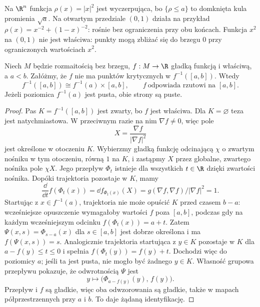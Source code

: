 \begin{przyklad}
Na $\R^n$ funkcja $\rho(x)=|x|^2$
jest wyczerpująca, bo
$\{\rho\leq a\}$ to domknięta
kula promienia $\sqrt a$.
Na otwartym przedziale $(0,1)$
działa na przykład
$\rho(x)=x^{-2}+(1-x)^{-2}$:
rośnie bez ograniczenia przy
obu końcach. Funkcja $x^2$
na $(0,1)$ nie jest właściwa:
punkty mogą zbliżać się do
brzegu $0$ przy ograniczonych
wartościach $x^2$.
\end{przyklad}

\begin{twierdzenie}
\label{thm:pas-bez-krytycznych-15}
Niech $M$ będzie rozmaitością bez brzegu,
$f:M\to\R$ gładką funkcją
i właściwą, a $a<b$. Załóżmy,
że $f$ nie ma punktów krytycznych
w $f^{-1}([a,b])$. Wtedy
\[
 f^{-1}([a,b])\cong f^{-1}(a)\times[a,b],
 \qquad f\ \text{odpowiada rzutowi na }[a,b].
\]
Jeżeli poziomica $f^{-1}(a)$ jest pusta,
obie strony są puste.
\end{twierdzenie}
\begin{proof}
Pas $K=f^{-1}([a,b])$ jest zwarty,
bo $f$ jest właściwa. Dla $K=\varnothing$ teza
jest natychmiastowa. W przeciwnym razie na nim
$\nabla f\ne0$, więc pole
\[
 X=\frac{\nabla f}{|\nabla f|^2}
\]
jest określone w otoczeniu $K$.
Wybierzmy gładką funkcję
odcinającą $\chi$ o zwartym
nośniku w tym otoczeniu,
równą $1$ na $K$, i zastąpmy
$X$ przez globalne, zwartego
nośnika pole $\chi X$.
Jego przepływ $\Phi_t$
istnieje dla wszystkich
$t\in\R$ dzięki zwartości
nośnika. Dopóki trajektoria
pozostaje w $K$, mamy
\[
 \frac{\dd}{\dd t}f(\Phi_t(x))
 =\dd f_{\Phi_t(x)}(X)
 =g(\nabla f,\nabla f)/|\nabla f|^2=1.
\]
Startując z $x\in f^{-1}(a)$,
trajektoria nie może opuścić
$K$ przed czasem $b-a$:
wcześniejsze opuszczenie
wymagałoby wartości $f$
poza $[a,b]$, podczas gdy
na każdym wcześniejszym
odcinku $f(\Phi_t(x))=a+t$.
Zatem
$\Psi(x,s)=\Phi_{s-a}(x)$
dla $s\in[a,b]$ jest
dobrze określona i ma
$f(\Psi(x,s))=s$.
Analogicznie trajektoria startująca z $y\in K$
pozostaje w $K$ dla $a-f(y)\leq t\leq0$ i spełnia
$f(\Phi_t(y))=f(y)+t$. Dochodzi więc do poziomicy $a$;
jeśli ta jest pusta, nie mogło być żadnego $y\in K$.
Własność grupowa przepływu pokazuje, że odwrotnością
$\Psi$ jest
\[
 y\longmapsto
       \bigl(\Phi_{a-f(y)}(y),\,f(y)\bigr).
\]
Przepływ i $f$ są gładkie,
więc oba odwzorowania są gładkie,
także w mapach półprzestrzennych
przy $a$ i $b$. To daje
żądaną identyfikację.
\end{proof}

